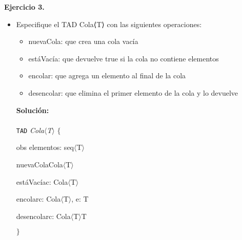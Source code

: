 \documentclass{article}
\newenvironment{tad}[1]{
	\paragraph{} \vspace*{-4mm}
	\newcommand{\obs}[2]{\texttt{obs} ##1 : ##2}

	\vspace{1ex}
	\texttt{TAD} \textit{#1} $\{$
	\par
	\tocarEspacios
}
{

\hspace{2.5mm} $\}$
\vspace{2ex}
}
\begin{document}
\textbf{Ejercicio 3.} 
\begin{itemize}
    \item [a)] Especifique el TAD Cola⟨T⟩ con las siguientes operaciones:
    \begin{itemize}
        \item [a)] nuevaCola: que crea una cola vac\'ia
        \item [b)] est\'aVac\'ia: que devuelve true si la cola no contiene elementos
        \item [c)] encolar: que agrega un elemento al final de la cola
        \item [d)] desencolar: que elimina el primer elemento de la cola y lo devuelve
    \end{itemize}
    \textbf{Soluci\'on:}
    \begin{tad}{Cola$\langle$T$\rangle$}
        obs elementos: seq$\langle$T$\rangle$

        \begin{proc}{nuevaCola}{}{Cola$\langle$T$\rangle$}
        \end{proc}

        \begin{proc}{est\'aVac\'ia}{\In c: Cola$\langle$T$\rangle$}{\bool}
        \end{proc}

        \begin{proc}{encolar}{\Inout c: Cola$\langle$T$\rangle$, \In e: T}{}
        \end{proc}

        \begin{proc}{desencolar}{\Inout c: Cola$\langle$T$\rangle$}{T}
        \end{proc}
    \end{tad}
        

\end{itemize}
\end{document}

